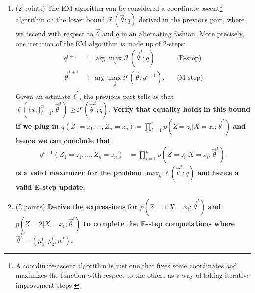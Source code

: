 \documentclass[11pt]{article}
\begin{document}
\begin{enumerate}[label=(\alph*)]
\item  (2 points) The EM algorithm can be considered a
coordinate-ascent\footnote{A coordinate-ascent algorithm is just one
  that fixes some coordinates and maximizes the function with respect
  to the others as a way of taking iterative improvement steps.} algorithm
  on the
lower bound $\mathcal{F}(\vec{\theta}; q)$ derived in the previous part,
where we ascend with respect to $\vec\theta$ and $q$ in an alternating fashion.
More precisely, one iteration of the EM algorithm is made up of 2-steps:
\begin{align*}
  q^{t+1} &= \arg\max_{q} \mathcal{F}(\vec{\theta}^t; q) \quad&\text{(E-step)}\\
  {\vec{\theta}}^{t+1} &\in \arg\max_{\vec\theta} \mathcal{F}(\vec{\theta}; q^{t+1}).  \quad&\text{(M-step)}
\end{align*}
Given an estimate $\vec\theta^t$, the previous part tells us that 
$\ell(\{x_i\}_{i=1}^n; \vec{\theta}^t)  \geq 
  \mathcal{F}(\vec{\theta}^t; q)$. {\bf Verify that equality holds in
    this bound if we plug in $q(Z_1=z_1, \ldots, Z_n=z_n) 
  = \prod_{i=1}^n p(Z = z_i\vert X= x_i; \vec{\theta}^t)$
and hence we can conclude that 
\begin{align}
\label{eq:estep}
  q^{t+1}(Z_1=z_1, \ldots, Z_n=z_n) 
  &= \prod_{i=1}^n p(Z = z_i\vert X= x_i; \vec{\theta}^t).
\end{align}
is a valid maximizer for the problem $\max_{q} \mathcal{F}(\vec{\theta}^t; q)$ 
and hence a valid E-step update.}

\item  (2 points) \textbf{Derive the expressions for $p(Z = 1\vert X= x_i;
\vec{\theta}^t)$
and $p(Z = 2\vert X= x_i; \vec{\theta}^t)$ to complete the E-step computations
where $\vec\theta^t = (\mu_1^t, \mu_2^t, w^t)$.}


\end{enumerate}
\end{document}
